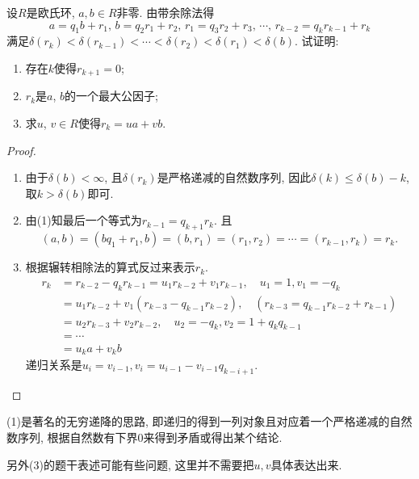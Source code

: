 \begin{problem}[辗转相除法]
    设$R$是欧氏环, $a, b \in R$非零. 由带余除法得
\[
a = q_{1}b + r_{1},\,
b = q_{2}r_{1}+ r_{2},\,
r_{1} = q_{3}r_{2} + r_{3},\, \cdots,\,
r_{k- 2}= q_{k}r_{k- 1}+ r_{k}
\]
满足$\delta(r_k) < \delta(r_{k - 1}) < \cdots < \delta(r_2) < \delta(r_1) < \delta(b)$.
试证明: 
\begin{enumerate}[(1)]
    \item 存在$k$使得$r_{k + 1} = 0$;
    \item $r_k$是$a$, $b$的一个最大公因子;
    \item 求$u$, $v \in R$使得$r_k = ua + vb$.
\end{enumerate}
\end{problem}

\begin{proof}
\begin{enumerate}[(1)]
    \item 由于$\delta(b) < \infty$, 且$\delta(r_k)$是严格递减的自然数序列, 因此$\delta(k) \leqslant \delta(b) - k$, 取$k > \delta(b)$即可.
    \item 由(1)知最后一个等式为$r_{k - 1} = q_{k + 1}r_{k}$. 且
\[
    (a, b) = (bq_1 + r_1, b) = (b, r_1) = (r_1, r_2) = \cdots = (r_{k - 1}, r_k) = r_k.
\]
    \item 根据辗转相除法的算式反过来表示$r_k$.
\[
    \begin{aligned}
        r_k &= r_{k - 2} - q_kr_{k - 1} = u_1r_{k - 2} + v_1r_{k - 1},\quad u_1 = 1, v_1 = -q_k\\ 
        &= u_1r_{k - 2} + v_1(r_{k - 3} - q_{k - 1}r_{k - 2}),\quad (r_{k - 3} = q_{k - 1}r_{k - 2} + r_{k - 1})\\
        &= u_2r_{k - 3} + v_2r_{k - 2}, \quad u_2 = -q_k, v_2 = 1 + q_kq_{k - 1}\\
        &= \cdots \\
        &= u_ka + v_kb 
    \end{aligned}
\]
递归关系是$u_i = v_{i - 1}, v_i = u_{i - 1} - v_{i - 1}q_{k - i + 1}$.
\end{enumerate}
\end{proof}

\begin{remark}
    (1)是著名的无穷递降的思路, 即递归的得到一列对象且对应着一个严格递减的自然数序列, 根据自然数有下界$0$来得到矛盾或得出某个结论.

    另外(3)的题干表述可能有些问题, 这里并不需要把$u, v$具体表达出来.
\end{remark}

